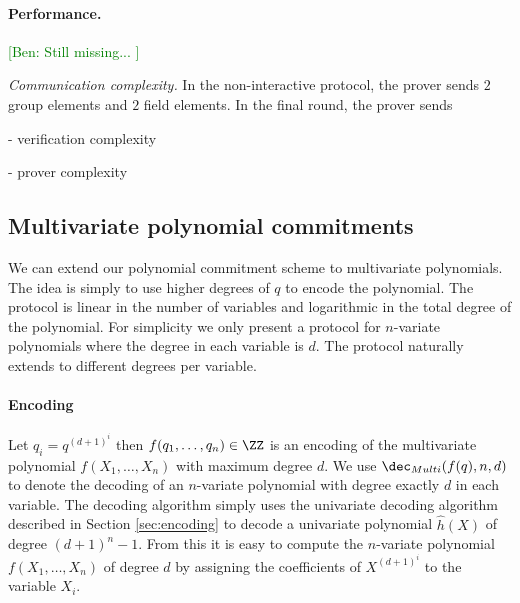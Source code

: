 \documentclass{article}
\theoremstyle{definition}
\newcommand{\ben}[1]{{\textcolor{green}{[Ben: #1]}}}
\newcommand{\ben}[1]{}
\begin{document}

\paragraph{Performance.} 
\ben{Still missing... } 

\textit{Communication complexity.} In the non-interactive protocol, the prover sends $2$ group elements and $2$ field elements. In the final round, the prover sends 
 
 - verification complexity 
 
 - prover complexity

\subsection{Multivariate polynomial commitments}\label{sec:multivariate}

We can extend our polynomial commitment scheme to multivariate polynomials. The idea is simply to use higher degrees of $q$ to encode the polynomial. The protocol is linear in the number of variables and logarithmic in the total degree of the polynomial. For simplicity we only present a protocol for $n$-variate polynomials where the degree in each variable is $d$. The protocol naturally extends to different degrees per variable.
\paragraph{Encoding}
Let $q_i=q^{(d+1)^i}$ then $f(q_1,\dots,q_n)\in \ZZ$ is an encoding of the multivariate polynomial $f(X_1,\dots,X_n)$ with maximum degree $d$. We use $\dec_{Multi}(f(q),n,d)$ to denote the decoding of an $n$-variate polynomial with degree exactly $d$ in each variable. The decoding algorithm simply uses the univariate decoding algorithm described in Section \ref{sec:encoding} to decode a univariate polynomial $\hat{h}(X)$ of degree $(d+1)^n-1$. From this it is easy to compute the $n$-variate polynomial $f(X_1,\dots,X_n)$ of degree $d$ by assigning the coefficients of $X^{(d+1)^i}$ to the variable $X_i$.
\end{document}
